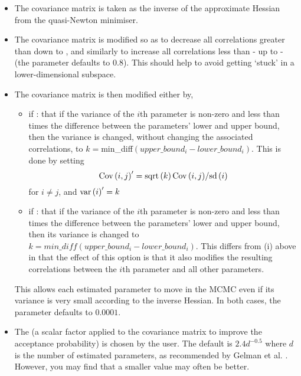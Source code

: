 \begin{itemize}
\item The covariance matrix is taken as the inverse of the approximate Hessian from the quasi-Newton minimiser.
\item The covariance matrix is modified so as to decrease all correlations greater than  down to , and similarly to increase all correlations less than  - up to - (the  parameter defaults to 0.8). This should help to avoid getting `stuck' in a lower-dimensional subspace.

\item The covariance matrix is then modified either by,

\begin{itemize}
\item if : that if the variance of the $i$th parameter is non-zero and less than  times the difference between the parameters' lower and upper bound, then the variance is changed, without changing the associated correlations, to $k=$min\_diff$(upper\_bound_i-lower\_bound_i)$. This is done by setting \[
{\mathop{\rm Cov}\nolimits} \left( {i,j} \right)^\prime   = {{{\mathop{\rm sqrt}\nolimits} \left( k \right){\mathop{\rm Cov}\nolimits} \left( {i,j} \right)} \mathord{\left/
{\vphantom {{{\mathop{\rm sqrt}\nolimits} \left( k \right){\mathop{\rm Cov}\nolimits} \left( {i,j} \right)} {{\mathop{\rm sd}\nolimits} \left( i \right)}}} \right.
\kern-\nulldelimiterspace} {{\mathop{\rm sd}\nolimits} \left( i \right)}}
\]
for $i \ne j$, and ${\mathop{\rm var}} \left( i \right)^\prime   = k$

\item if : that if the variance of the $i$th parameter is non-zero and less than  times the difference between the parameters' lower and upper bound, then its variance is changed to $k=min\_diff(upper\_bound_i-lower\_bound_i)$. This differs from (i) above in that the effect of this option is that it also modifies the resulting correlations between the $i$th parameter and all other parameters.
\end{itemize}

This allows each estimated parameter to move in the MCMC even if its variance is very small according to the inverse Hessian. In both cases, the  parameter defaults to $0.0001$.

\item The  (a scalar factor applied to the covariance matrix to improve the acceptance probability) is chosen by the user. The default is $2.4d^{-0.5}$ where $d$ is the number of estimated parameters, as recommended by Gelman et al. \citep{823}. However, you may find that a smaller value may often be better. 
\end{itemize}

